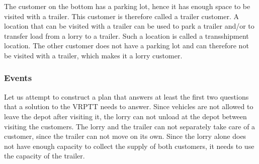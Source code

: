
The customer on the bottom has a parking lot, hence it has enough space to be visited with a trailer.
This customer is therefore called a trailer customer.
A location that can be visited with a trailer can be used to park a trailer and/or to transfer load from a lorry to a trailer.
Such a location is called a transshipment location.
The other customer does not have a parking lot and can therefore not be visited with a trailer, which makes it a lorry customer.\\





\subsubsection{Events}


Let us attempt to construct a plan that answers at least the first two questions that a solution to the VRPTT needs to answer.
Since vehicles are not allowed to leave the depot after visiting it, the lorry can not unload at the depot between visiting the customers.
The lorry and the trailer can not separately take care of a customer, since the trailer can not move on its own.
Since the lorry alone does not have enough capacity to collect the supply of both customers, it needs to use the capacity of the trailer.
\\


